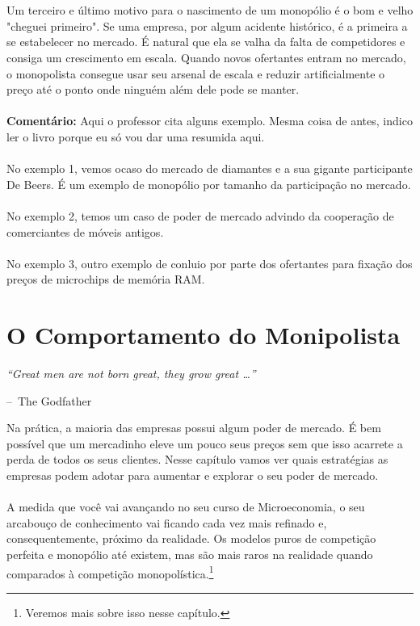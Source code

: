 \documentclass[a4paper,11pt,oneside]{book}
\makeatletter
\theoremstyle{definition}
\theoremstyle{break}
\newenvironment{chapquote}[2][2em]
  {\setlength{\@tempdima}{#1}%
   \def\chapquote@author{#2}%
   \parshape 1 \@tempdima \dimexpr\textwidth-2\@tempdima\relax%
   \itshape}
  {\par\normalfont\hfill--\ \chapquote@author\hspace*{\@tempdima}\par\bigskip}
\makeatother
\begin{document}
\\
\\
Um terceiro e último motivo para o nascimento de um monopólio é o bom e velho "cheguei primeiro". Se uma empresa, por algum acidente histórico, é a primeira a se estabelecer no mercado. É natural que ela se valha da falta de competidores e consiga um crescimento em escala. Quando novos ofertantes entram no mercado, o monopolista consegue usar seu arsenal de escala e reduzir artificialmente o preço até o ponto onde ninguém além dele pode se manter.
\\
\\
\textbf{Comentário:} Aqui o professor cita alguns exemplo. Mesma coisa de antes, indico ler o livro porque eu só vou dar uma resumida aqui.
\\
\\
No exemplo 1, vemos ocaso do mercado de diamantes e a sua gigante participante De Beers. É um exemplo de monopólio por tamanho da participação no mercado.
\\
\\
No exemplo 2, temos um caso de poder de mercado advindo da cooperação de comerciantes de móveis antigos.
\\
\\
No exemplo 3, outro exemplo de conluio por parte dos ofertantes para fixação dos preços de microchips de memória RAM.

\chapter{O Comportamento do Monipolista}

\begin{chapquote}{The Godfather}
	``Great men are not born great, they grow great \dots''
\end{chapquote}

Na prática, a maioria das empresas possui algum poder de mercado. É bem possível que um mercadinho eleve um pouco seus preços sem que isso acarrete a perda de todos os seus clientes. Nesse capítulo vamos ver quais estratégias as empresas podem adotar para aumentar e explorar o seu poder de mercado.
\\
\\
A medida que você vai avançando no seu curso de Microeconomia, o seu arcabouço de conhecimento vai ficando cada vez mais refinado e, consequentemente, próximo da realidade. Os modelos puros de competição perfeita e monopólio até existem, mas são mais raros na realidade quando comparados à competição monopolística.\footnote{Veremos mais sobre isso nesse capítulo.}
\end{document}
